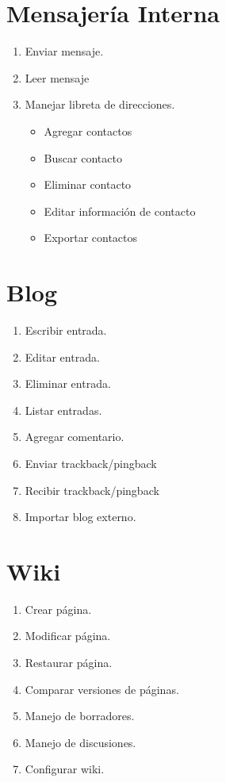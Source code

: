 \documentclass{article}
\begin{document}
\section{Mensajería Interna}
\begin{enumerate}
	\item Enviar mensaje.
	\item Leer mensaje
	\item Manejar libreta de direcciones.
	\begin{itemize}
		\item Agregar contactos
		\item Buscar contacto
		\item Eliminar contacto
		\item Editar información de contacto
		\item Exportar contactos
	\end{itemize}
\end{enumerate}



\section{Blog}
\begin{enumerate}
	\item Escribir entrada.
	\item Editar entrada.
	\item Eliminar entrada.
	\item Listar entradas.
	\item Agregar comentario.
	\item Enviar trackback/pingback
	\item Recibir trackback/pingback
	\item Importar blog externo.
\end{enumerate}

\section{Wiki}
\begin{enumerate}
	\item Crear página.
	\item Modificar página.
	\item Restaurar página.
	\item Comparar versiones de páginas.
	\item Manejo de borradores.
	\item Manejo de discusiones.
	\item Configurar wiki.
\end{enumerate}
\end{document}
